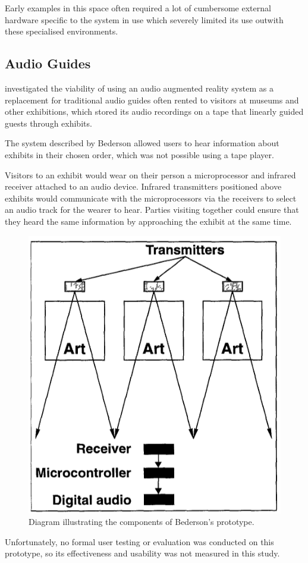 \documentclass{l4proj}
\begin{document}
Early examples in this space often required a lot of cumbersome external hardware specific to the system in use which severely limited its use outwith these specialised environments.

\subsection{Audio Guides}
\cite{bederson_audio_1995} investigated the viability of using an audio augmented reality system as a replacement for traditional audio guides often rented to visitors at museums and other exhibitions, which stored its audio recordings on a tape that linearly guided guests through exhibits.

The system described by Bederson allowed users to hear information about exhibits in their chosen order, which was not possible using a tape player. 

Visitors to an exhibit would wear on their person a microprocessor and infrared receiver attached to an audio device. Infrared transmitters positioned above exhibits would communicate with the microprocessors via the receivers to select an audio track for the wearer to hear. Parties visiting together could ensure that they heard the same information by approaching the exhibit at the same time.

\begin{figure}[htb!]
    \centering
    \includegraphics[width=0.5\linewidth]{images/bederson_diagram.png}
    \caption{Diagram illustrating the components of Bederson's prototype. \citep{bederson_audio_1995}}
    \label{fig:my_label}
\end{figure}

Unfortunately, no formal user testing or evaluation was conducted on this prototype, so its effectiveness and usability was not measured in this study.
\end{document}
